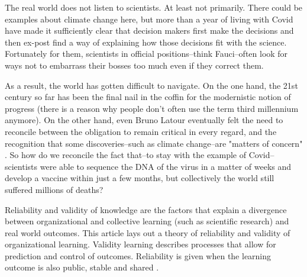 
The real world does not listen to scientists. At least not primarily. There could be examples about climate change here, but more than a year of living with Covid have made it sufficiently clear that decision makers first make the decisions and then ex-post find a way of explaining how those decisions fit with the science. Fortunately for them, scientists in official positions--think Fauci--often look for ways not to embarrass their bosses too much even if they correct them.

As a result, the world has gotten difficult to navigate. On the one hand, the 21st century so far has been the final nail in the coffin for the modernistic notion of progress (there is a reason why people don't often use the term third millennium anymore). On the other hand, even Bruno Latour eventually felt the need to reconcile between the obligation to remain critical in every regard, and the recognition that some discoveries--such as climate change--are "matters of concern" \citep{Latour2004}. So how do we reconcile the fact that--to stay with the example of Covid--scientists were able to sequence the DNA of the virus in a matter of weeks and develop a vaccine within just a few months, but collectively the world still suffered millions of deaths?

Reliability and validity of knowledge are the factors that explain a divergence between organizational and collective learning (such as scientific research) and real world outcomes. This article lays out a theory of reliability and validity of organizational learning. Validity learning describes processes that allow for prediction and control of outcomes. Reliability is given when the learning outcome is also public, stable and shared \citep{March1991a}. 

